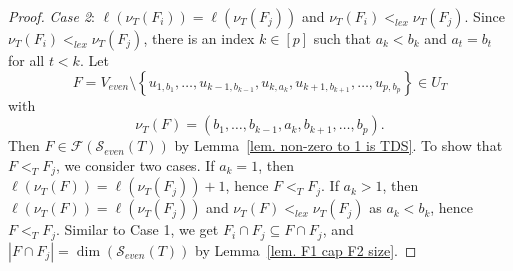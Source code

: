 \documentclass[10pt,a4paper]{amsart}
\newcommand{\calS}{\mathcal{S}}
\newcommand\set[1]{\left\lbrace #1 \right\rbrace}
\begin{document}
\begin{proof}
    \noindent\emph{Case 2}: $\ell(\nu_T(F_i)) = \ell(\nu_T(F_j))$ and $\nu_T(F_i) <_{lex} \nu_T(F_j)$.
    Since $\nu_T(F_i) <_{lex} \nu_T(F_j)$, there is an index $k \in [p]$ such that $a_k < b_k$ and $a_t = b_t$ for all $t < k$.
    Let 
    $$
    F = V_{even} \setminus \set{u_{1,b_1},\dots,u_{k-1,b_{k-1}}, u_{k,a_k}, u_{k+1,b_{k+1}},\dots,u_{p,b_p}} \in U_T 
    $$ 
    with
    $$
    \nu_T(F) = (b_1,\dots,b_{k-1},a_{k},b_{k+1},\dots,b_p).
    $$
    Then $F \in \mathcal{F}(\calS_{even}(T))$ by Lemma~\ref{lem. non-zero to 1 is TDS}.
    To show that $F <_T F_j$, we consider two cases.
    If $a_k = 1$, then $\ell(\nu_T(F)) = \ell(\nu_T(F_j)) + 1$, hence $F <_T F_j$.
    If $a_k > 1$, then $\ell(\nu_T(F)) = \ell(\nu_T(F_j))$ and $\nu_T(F) <_{lex} \nu_T(F_j)$ as $a_k < b_k$, hence $F <_T F_j$.
    Similar to Case 1, we get $F_i \cap F_j \subseteq F \cap F_j$, and $|F \cap F_j| = \dim(\calS_{even}(T))$ by Lemma~\ref{lem. F1 cap F2 size}.
\end{proof}
\end{document}

